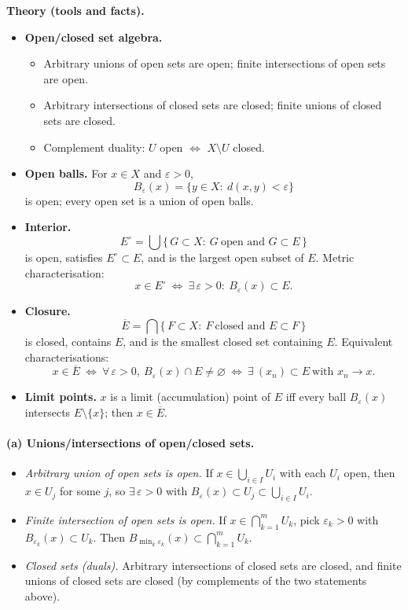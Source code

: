 \documentclass[12pt,a4paper]{article}
\theoremstyle{plain}
\theoremstyle{definition}
\theoremstyle{remark}
\theoremstyle{remark}
\begin{document}
\bigskip
\noindent\textbf{Theory (tools and facts).}
\begin{itemize}
	\item \textbf{Open/closed set algebra.}
	\begin{itemize}
		\item Arbitrary unions of open sets are open; finite intersections of open sets are open.
		\item Arbitrary intersections of closed sets are closed; finite unions of closed sets are closed.
		\item Complement duality: $U$ open $\Leftrightarrow$ $X\setminus U$ closed.
	\end{itemize}
	
	\item \textbf{Open balls.} For $x\in X$ and $\varepsilon>0$,
	\[
	B_\varepsilon(x)=\{y\in X:\ d(x,y)<\varepsilon\}
	\]
	is open; every open set is a union of open balls.
	
	\item \textbf{Interior.}
	\[
	E^\circ=\bigcup\{\,G\subset X:\ G\ \text{open and } G\subset E\,\}
	\]
	is open, satisfies $E^\circ\subset E$, and is the largest open subset of $E$.
	Metric characterisation:
	\[
	x\in E^\circ\ \Longleftrightarrow\ \exists\,\varepsilon>0:\ B_\varepsilon(x)\subset E.
	\]
	
	\item \textbf{Closure.}
	\[
	\overline{E}=\bigcap\{\,F\subset X:\ F\ \text{closed and } E\subset F\,\}
	\]
	is closed, contains $E$, and is the smallest closed set containing $E$.
	Equivalent characterisations:
	\[
	x\in\overline{E}\ \Longleftrightarrow\ \forall\,\varepsilon>0,\ B_\varepsilon(x)\cap E\neq\varnothing
	\ \Longleftrightarrow\ \exists\ (x_n)\subset E\ \text{with } x_n\to x.
	\]
	
	\item \textbf{Limit points.} $x$ is a limit (accumulation) point of $E$ iff every ball
	$B_\varepsilon(x)$ intersects $E\setminus\{x\}$; then $x\in\overline{E}$.
\end{itemize}

\paragraph{(a) Unions/intersections of open/closed sets.}
\begin{itemize}
	\item \emph{Arbitrary union of open sets is open.}
	If $x\in\bigcup_{i\in I}U_i$ with each $U_i$ open, then $x\in U_j$ for some $j$,
	so $\exists\,\varepsilon>0$ with $B_\varepsilon(x)\subset U_j\subset\bigcup_{i\in I}U_i$.
	\item \emph{Finite intersection of open sets is open.}
	If $x\in\bigcap_{k=1}^m U_k$, pick $\varepsilon_k>0$ with $B_{\varepsilon_k}(x)\subset U_k$.
	Then $B_{\min_k \varepsilon_k}(x)\subset\bigcap_{k=1}^m U_k$.
	\item \emph{Closed sets (duals).}
	Arbitrary intersections of closed sets are closed, and finite unions of closed sets are closed
	(by complements of the two statements above).
\end{itemize}
\end{document}
